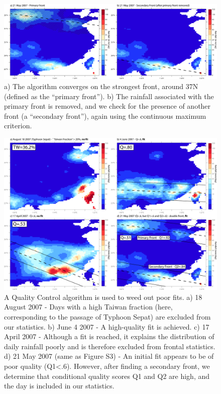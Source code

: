 \documentclass[draft,grl]{agutexSI}
\begin{document}
\begin{article}
\begin{figure}
\noindent\includegraphics[width=36pc]{Figures/S3}
\caption{a) The algorithm converges on the strongest front, around 37N (defined as the ``primary front''). b) The rainfall associated with the primary front is removed, and we check for the presence of another front (a ``secondary front''), again using the continuous maximum criterion.}
\end{figure}

\begin{figure}

\noindent\includegraphics[width=36pc]{Figures/S4}
\caption{A Quality Control algorithm is used to weed out poor fits. a) 18 August 2007 - Days with a high Taiwan fraction (here, corresponding to the passage of Typhoon Sepat) are excluded from our statistics. b) June 4 2007 - A high-quality fit is achieved. c) 17 April 2007 - Although a fit is reached, it explains the distribution of daily rainfall poorly and is therefore excluded from frontal statistics. d) 21 May 2007 (same as Figure S3) - An initial fit appears to be of poor quality (Q1<.6). However, after finding a secondary front, we determine that conditional quality scores Q1 and Q2 are high, and the day is included in our statistics.}
\end{figure}

\end{article}
\end{document}
